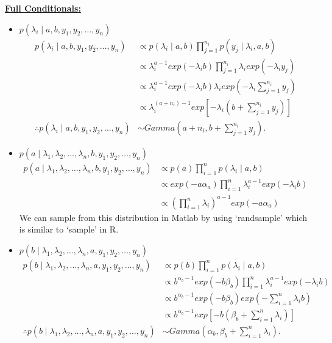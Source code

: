 \documentclass{article}
\begin{document}
\noindent \underline{\textbf{Full Conditionals:}}\\
\begin{itemize}
\item $p(\lambda_i \mid a,b,y_1,y_2,\ldots,y_n)$
\begin{align*}
p(\lambda_i \mid a,b,y_1,y_2,\ldots,y_n) &\propto p(\lambda_i \mid a,b)\prod_{j=1}^{n_i}{p(y_j \mid \lambda_i,a,b)}\\
&\propto \lambda_i^{a-1}exp(-\lambda_ib) \prod_{j=1}^{n_i}{\lambda_iexp(-\lambda_iy_j)}\\
&\propto \lambda_i^{a-1}exp(-\lambda_ib) \lambda_i exp\left(-\lambda_i\sum_{j=1}^{n_i}{y_j}\right)\\
&\propto \lambda_i^{(a+n_i)-1}exp\left[-\lambda_i\left(b+\sum_{j=1}^{n_i}{y_j}\right)\right]\\
\therefore p(\lambda_i \mid a,b,y_1,y_2,\ldots,y_n) &\sim Gamma\left(a+n_i,b+\sum_{j=1}^{n_i}{y_j}\right).
\end{align*}

\item $p(a \mid \lambda_1,\lambda_2,\ldots,\lambda_n,b,y_1,y_2,\ldots,y_n)$
\begin{align*}
p(a \mid \lambda_1,\lambda_2,\ldots,\lambda_n,b,y_1,y_2,\ldots,y_n) &\propto p(a) \prod_{i=1}^{n}{p(\lambda_i \mid a,b)}\\
&\propto exp(-a\alpha_a)\prod_{i=1}^{n}{\lambda_i^{a-1}exp(-\lambda_ib)}\\
&\propto \left(\prod_{i=1}^{n}{\lambda_i}\right)^{a-1}exp(-a\alpha_a)
\end{align*}
We can sample from this distribution in Matlab by using `randsample' which is similar to `sample' in R.

\item $p(b \mid \lambda_1,\lambda_2,\ldots,\lambda_n,a,y_1,y_2,\ldots,y_n)$
\begin{align*}
p(b \mid \lambda_1,\lambda_2,\ldots,\lambda_n,a,y_1,y_2,\ldots,y_n) &\propto p(b) \prod_{i=1}^{n}{p(\lambda_i \mid a,b)}\\
&\propto b^{\alpha_b-1} exp(-b\beta_b) \prod_{i=1}^{n}{\lambda_i^{a-1}exp(-\lambda_ib)}\\
&\propto b^{\alpha_b-1} exp(-b\beta_b) exp\left(-\sum_{i=1}^{n}{\lambda_i}b\right)\\
&\propto b^{\alpha_b-1} exp\left[-b\left(\beta_b+\sum_{i=1}^{n}{\lambda_i}\right)\right]\\
\therefore p(b \mid \lambda_1,\lambda_2,\ldots,\lambda_n,a,y_1,y_2,\ldots,y_n) &\sim Gamma\left(\alpha_b,\beta_b+\sum_{i=1}^{n}{\lambda_i}\right).
\end{align*}
\end{itemize}
\end{document}
